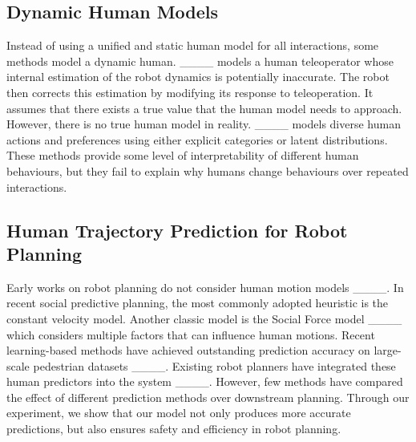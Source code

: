 \subsection{Dynamic Human Models}
Instead of using a unified and static human model for all interactions, some methods model a dynamic human. 
____ models a human teleoperator whose internal estimation of the robot dynamics is potentially inaccurate. The robot then corrects this estimation by modifying its response to teleoperation. It assumes that there exists a true value that the human model needs to approach. However, there is no true human model in reality. 
____ models diverse human actions and preferences using either explicit categories or latent distributions.
These methods provide some level of interpretability of different human behaviours, but they fail to explain why humans change behaviours over repeated interactions.

\subsection{Human Trajectory Prediction for Robot Planning}
\label{seq:traj_prediction}
Early works on robot planning do not consider human motion models ____.
In recent social predictive planning, the most commonly adopted heuristic is the constant velocity model. 
Another classic model is the Social Force model ____ which considers multiple factors that can influence human motions. 
Recent learning-based methods have achieved outstanding prediction accuracy on large-scale pedestrian datasets ____. 
Existing robot planners have integrated these human predictors into the system ____. 
However, few methods have compared the effect of different prediction methods over downstream planning. 
Through our experiment, we show that our model not only produces more accurate predictions, but also ensures safety and efficiency in robot planning.